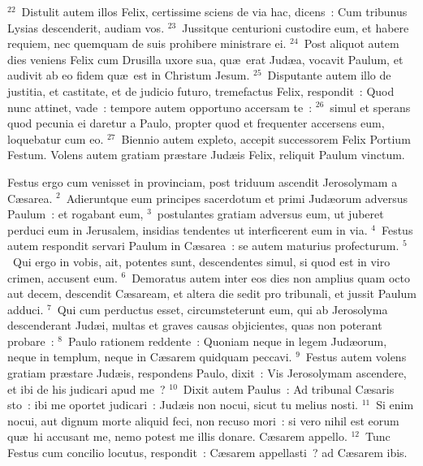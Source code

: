 ${}^{22}$~Distulit autem illos Felix, certissime sciens de via hac, dicens~: Cum tribunus Lysias descenderit, audiam vos.
${}^{23}$~Jussitque centurioni custodire eum, et habere requiem, nec quemquam de suis prohibere ministrare ei.
${}^{24}$~Post aliquot autem dies veniens Felix cum Drusilla uxore sua, qu\ae\ erat Jud\ae a, vocavit Paulum, et audivit ab eo fidem qu\ae\ est in Christum Jesum.
${}^{25}$~Disputante autem illo de justitia, et castitate, et de judicio futuro, tremefactus Felix, respondit~: Quod nunc attinet, vade~: tempore autem opportuno accersam te~:
${}^{26}$~simul et sperans quod pecunia ei daretur a Paulo, propter quod et frequenter accersens eum, loquebatur cum eo.
${}^{27}$~Biennio autem expleto, accepit successorem Felix Portium Festum. Volens autem gratiam pr\ae stare Jud\ae is Felix, reliquit Paulum vinctum.

\lettrine[lines=3,image=true,loversize=0.05,lraise=-0.03]{F}{}estus ergo cum venisset in provinciam, post triduum ascendit Jerosolymam a C\ae sarea.
${}^{2}$~Adieruntque eum principes sacerdotum et primi Jud\ae orum adversus Paulum~: et rogabant eum,
${}^{3}$~postulantes gratiam adversus eum, ut juberet perduci eum in Jerusalem, insidias tendentes ut interficerent eum in via.
${}^{4}$~Festus autem respondit servari Paulum in C\ae sarea~: se autem maturius profecturum.
${}^{5}$~Qui ergo in vobis, ait, potentes sunt, descendentes simul, si quod est in viro crimen, accusent eum.
${}^{6}$~Demoratus autem inter eos dies non amplius quam octo aut decem, descendit C\ae saream, et altera die sedit pro tribunali, et jussit Paulum adduci.
${}^{7}$~Qui cum perductus esset, circumsteterunt eum, qui ab Jerosolyma descenderant Jud\ae i, multas et graves causas objicientes, quas non poterant probare~:
${}^{8}$~Paulo rationem reddente~: Quoniam neque in legem Jud\ae orum, neque in templum, neque in C\ae sarem quidquam peccavi.
${}^{9}$~Festus autem volens gratiam pr\ae stare Jud\ae is, respondens Paulo, dixit~: Vis Jerosolymam ascendere, et ibi de his judicari apud me~?
${}^{10}$~Dixit autem Paulus~: Ad tribunal C\ae saris sto~: ibi me oportet judicari~: Jud\ae is non nocui, sicut tu melius nosti.
${}^{11}$~Si enim nocui, aut dignum morte aliquid feci, non recuso mori~: si vero nihil est eorum qu\ae\ hi accusant me, nemo potest me illis donare. C\ae sarem appello.
${}^{12}$~Tunc Festus cum concilio locutus, respondit~: C\ae sarem appellasti~? ad C\ae sarem ibis.


